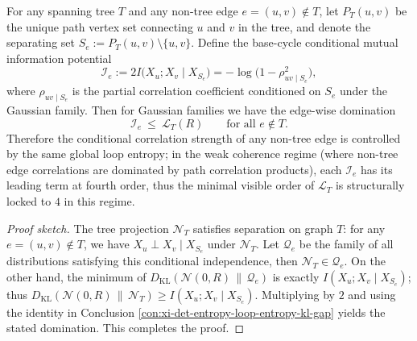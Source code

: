 \begin{conclusion}\label{con:xi-det-entropy-tree-basecycle-cmi-certificate}
For any spanning tree \(T\) and any non-tree edge \(e=(u,v)\notin T\), let \(P_T(u,v)\) be the unique path vertex set connecting \(u\) and \(v\) in the tree, and denote the separating set
\(
S_e:=P_T(u,v)\setminus\{u,v\}
\).
Define the base-cycle conditional mutual information potential
\[
\mathcal I_e:=2I\!\bigl(X_u;X_v\mid X_{S_e}\bigr)
=-\log\bigl(1-\rho_{uv\mid S_e}^2\bigr),
\]
where \(\rho_{uv\mid S_e}\) is the partial correlation coefficient conditioned on \(S_e\) under the Gaussian family.
Then for Gaussian families we have the edge-wise domination
\[
\mathcal I_e\ \le\ \mathcal L_T(R)\qquad\text{for all }e\notin T.
\]
Therefore the conditional correlation strength of any non-tree edge is controlled by the same global loop entropy; in the weak coherence regime (where non-tree edge correlations are dominated by path correlation products), each \(\mathcal I_e\) has its leading term at fourth order, thus the minimal visible order of \(\mathcal L_T\) is structurally locked to \(4\) in this regime.
\end{conclusion}
\begin{proof}[Proof sketch]
The tree projection \(\mathcal N_T\) satisfies separation on graph \(T\): for any \(e=(u,v)\notin T\), we have \(X_u\perp X_v\mid X_{S_e}\) under \(\mathcal N_T\).
Let \(\mathcal Q_e\) be the family of all distributions satisfying this conditional independence, then
\(
\mathcal N_T\in\mathcal Q_e
\).
On the other hand, the minimum of \(D_{\mathrm{KL}}(\mathcal N(0,R)\,\|\,\mathcal Q_e)\) is exactly \(I(X_u;X_v\mid X_{S_e})\);
thus
\(
D_{\mathrm{KL}}(\mathcal N(0,R)\,\|\,\mathcal N_T)\ge I(X_u;X_v\mid X_{S_e})
\).
Multiplying by \(2\) and using the identity in Conclusion \ref{con:xi-det-entropy-loop-entropy-kl-gap} yields the stated domination. This completes the proof.
\end{proof}

